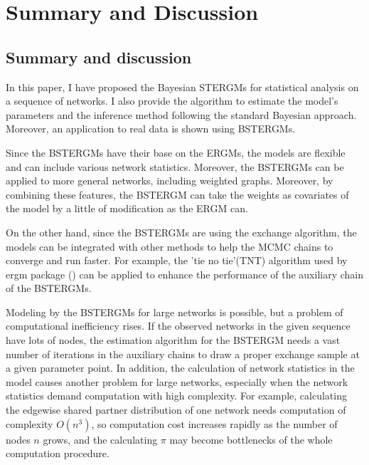 \documentclass[a4paper, 11pt]{report}
\theoremstyle{definition}
\begin{document}
\chapter{Summary and Discussion}\label{Chapter7}
\section{Summary and discussion}

In this paper, I have proposed the Bayesian STERGMs for statistical analysis on a sequence of networks. 
I also provide the algorithm to estimate the model's parameters and the inference method 
following the standard Bayesian approach. 
Moreover, an application to real data is shown using BSTERGMs.

Since the BSTERGMs have their base on the ERGMs, the models are flexible and can include various network statistics. 
Moreover, the BSTERGMs can be applied to more general networks, including weighted graphs. 
Moreover, by combining these features, the BSTERGM can take the weights as covariates of the model
by a little of modification as the ERGM can.

On the other hand, since the BSTERGMs are using the exchange algorithm, 
the models can be integrated with other methods to help the MCMC chains to converge and run faster. 
For example, the 'tie no tie'(TNT) algorithm used by ergm package (\cite{RN100}) can be applied 
to enhance the performance of the auxiliary chain of the BSTERGMs.

Modeling by the BSTERGMs for large networks is possible, 
but a problem of computational inefficiency rises. 
If the observed networks in the given sequence have lots of nodes, 
the estimation algorithm for the BSTERGM needs a vast number of iterations in the auxiliary chains 
to draw a proper exchange sample at a given parameter point. 
In addition, the calculation of network statistics in the model causes another problem for large networks, 
especially when the network statistics demand computation with high complexity.
For example, calculating the edgewise shared partner distribution of one network 
needs computation of complexity $O(n^3)$, 
so computation cost increases rapidly as the number of nodes $n$ grows, and 
the calculating $\pi$ may become bottlenecks of the whole computation procedure.
\end{document}
